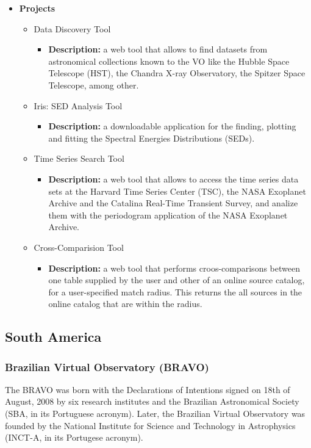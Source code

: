 \begin{itemize}
\item \textbf{Projects}
\begin{itemize}
\item Data Discovery Tool
\begin{itemize}
\item \textbf{Description:} a web tool that allows to find datasets from
astronomical collections known to the VO like the Hubble Space Telescope (HST),
the Chandra X-ray Observatory, the Spitzer Space Telescope, among other.
\end{itemize}
\item Iris: SED Analysis Tool
\begin{itemize}
\item \textbf{Description:} a downloadable application for the finding, plotting
and fitting the Spectral Energies Distributions (SEDs). 
\end{itemize}
\item Time Series Search Tool
\begin{itemize}
\item \textbf{Description:} a web tool that allows to access the time series
data sets at the Harvard Time Series Center (TSC), the NASA Exoplanet Archive
and the Catalina Real-Time Transient Survey, and analize them with the
periodogram application of the NASA Exoplanet Archive.
\end{itemize}
\item Cross-Comparision Tool
\begin{itemize}
\item \textbf{Description:} a web tool that performs croos-comparisons between
one table supplied by the user and other of an online source catalog, for a
user-specified match radius. This returns the all sources in the online catalog
that are within the radius.
\end{itemize}
\end{itemize}
\end{itemize}

\subsection{South America}
\subsubsection{Brazilian Virtual Observatory (BRAVO)}
The BRAVO \cite{website:bravo-home} was born with the Declarations of Intentions
signed on 18th of August, 2008 by six research institutes and the Brazilian
Astronomical Society (SBA, in its Portuguese acronym). Later, the Brazilian
Virtual Observatory was founded by the National Institute for Science and
Technology in Astrophysics (INCT-A, in its Portugese acronym).

